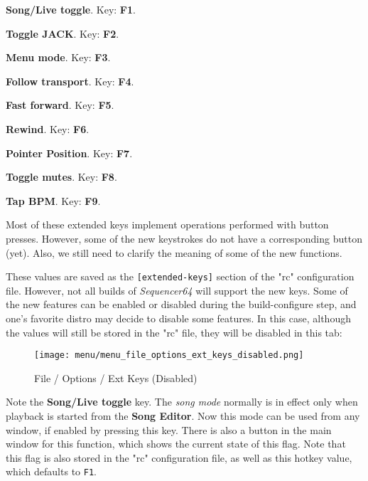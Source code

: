    \begin{enumber}
      \item \textbf{Song/Live toggle}.
         Key:  \textbf{F1}.
      \item \textbf{Toggle JACK}.
         Key:  \textbf{F2}.
      \item \textbf{Menu mode}.
         Key:  \textbf{F3}.
      \item \textbf{Follow transport}.
         Key:  \textbf{F4}.
      \item \textbf{Fast forward}.
         Key:  \textbf{F5}.
      \item \textbf{Rewind}.
         Key:  \textbf{F6}.
      \item \textbf{Pointer Position}.
         Key:  \textbf{F7}.
      \item \textbf{Toggle mutes}.
         Key:  \textbf{F8}.
      \item \textbf{Tap BPM}.
         Key:  \textbf{F9}.
   \end{enumber}

   Most of these extended keys implement operations performed with button
   presses.  However, some of the new keystrokes do not have a corresponding
   button (yet).  Also, we still need to clarify the meaning of some of the new
   functions.

   These values are saved as the \texttt{[extended-keys]} section of the "rc"
   configuration file.  However, not all builds of \textsl{Sequencer64} will
   support the new keys.  Some of the new features can be enabled or disabled
   during the build-configure step, and one's favorite distro may decide to
   disable some features.  In this case, although the values will still be
   stored in the "rc" file, they will be disabled in this tab:

\begin{figure}[H]
   \centering 
   \texttt{[image: menu/menu\_file\_options\_ext\_keys\_disabled.png]}
   \caption{File / Options / Ext Keys (Disabled)}
   \label{fig:seq64_menu_file_options_ext_keys_disabled}
\end{figure}

   Note the \textbf{Song/Live toggle} key.
   The \textsl{song mode} normally is in effect only when playback is started
   from the \textbf{Song Editor}.  Now this mode can be used from any
   window, if enabled by pressing this key.  There is also
   a button in the main window for this function, which shows the current state
   of this flag.  Note that this flag is also stored in the "rc" configuration
   file, as well as this hotkey value, which defaults to \texttt{F1}.

